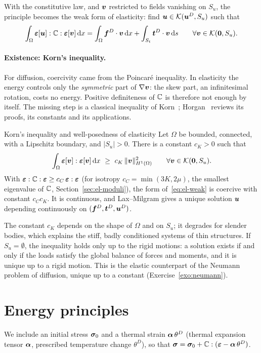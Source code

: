 With the constitutive law, and $\bm{v}$ restricted to fields vanishing on
$S_u$, the principle becomes the weak form of elasticity: find
$\bm{u}\in\mathcal{K}(\bm{u}^{D},S_u)$ such that
\begin{equation}\label{eq:el-weak}
  \int_\Omega\bm{\varepsilon}[\bm{u}]:\mathbb{C}:\bm{\varepsilon}[\bm{v}]\,\mathrm{d} x=\int_\Omega\bm{f}^{D}\cdot\bm{v}\,\mathrm{d} x
  +\int_{S_t}\bm{t}^{D}\cdot\bm{v}\,\mathrm{d} s\qquad\forall\bm{v}\in\mathcal{K}(\bm{0},S_u).
\end{equation}

\paragraph{Existence: Korn's inequality.}
%
For diffusion, coercivity came from the Poincar\'e inequality. In elasticity
the energy controls only the \emph{symmetric} part of $\nabla\bm{v}$: the skew
part, an infinitesimal rotation, costs no energy. Positive definiteness of
$\mathbb{C}$ is therefore not enough by itself. The missing step is a classical
inequality of Korn~\cite{Korn1908}; Horgan~\cite{Horgan1995}
reviews its proofs, its constants and its applications.
\begin{gbox}{Korn's inequality and well-posedness of elasticity}
Let $\Omega$ be bounded, connected, with a Lipschitz boundary, and
$|S_u|>0$. There is a constant $c_K>0$ such that
\[
  \int_\Omega\bm{\varepsilon}[\bm{v}]:\bm{\varepsilon}[\bm{v}]\,\mathrm{d} x\ \ge\ c_K\,\lVert \bm{v}\rVert^2_{H^1(\Omega)}
  \qquad\forall\bm{v}\in\mathcal{K}(\bm{0},S_u).
\]
With $\bm{\varepsilon}:\mathbb{C}:\bm{\varepsilon}\ge c_C\,\bm{\varepsilon}:\bm{\varepsilon}$ (for isotropy $c_C=\min(3K,2\mu)$, the smallest eigenvalue of $\mathbb{C}$,
Section~\ref{sec:el-moduli}), the form of~\eqref{eq:el-weak} is coercive with
constant $c_Cc_K$. It is continuous, and Lax--Milgram gives a unique solution
$\bm{u}$ depending continuously on $(\bm{f}^{D},\bm{t}^{D},\bm{u}^{D})$.
\end{gbox}
The constant $c_K$ depends on the shape of $\Omega$ and on $S_u$; it degrades
for slender bodies, which explains the stiff, badly conditioned systems of
thin structures. If $S_u=\emptyset$, the inequality holds only up to the rigid
motions: a solution exists if and only if the loads satisfy the global balance
of forces and moments, and it is unique up to a rigid motion. This is the
elastic counterpart of the Neumann problem of diffusion, unique up to a
constant (Exercise~\ref{exo:neumann}).

\section{Energy principles}\label{sec:el-energy}
%
We include an initial stress $\bm{\sigma}_0$ and a thermal strain
$\bm{\alpha}\,\theta^D$ (thermal expansion tensor $\bm{\alpha}$, prescribed
temperature change $\theta^D$), so that
$\bm{\sigma}=\bm{\sigma}_0+\mathbb{C}:(\bm{\varepsilon}-\bm{\alpha}\,\theta^D)$.

